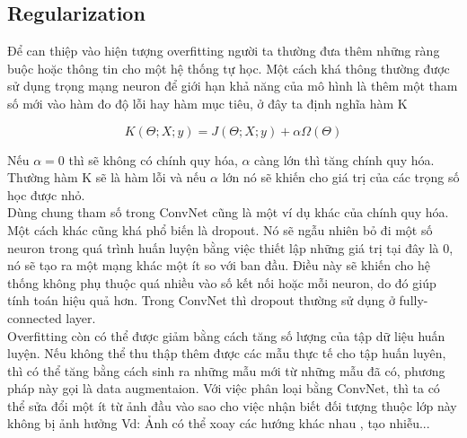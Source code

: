 \subsection{Regularization}
Để can thiệp vào hiện tượng overfitting người ta thường đưa thêm những ràng buộc hoặc thông tin cho một hệ thống tự học. 
Một cách khá thông thường được sử dụng trọng mạng neuron để giới hạn khả năng của mô hình là thêm một tham số mới vào hàm đo độ lỗi hay hàm mục tiêu, ở đây ta định nghĩa hàm K\cite{DLbook}
\begin{center}
	\begin{equation}
	 K(\Theta;X;y) = J(\Theta;X;y) + \alpha\Omega(\Theta)
	\end{equation}
\end{center}
Nếu $\alpha = 0$ thì sẽ không có chính quy hóa, $\alpha$ càng lớn thì tăng chính quy hóa. Thường hàm K sẽ là hàm lỗi và nếu $\alpha$ lớn nó sẽ khiến cho giá trị của các trọng số học được nhỏ.\\

Dùng chung tham số trong ConvNet cũng là một ví dụ khác của chính quy hóa.
Một cách khác cũng khá phổ biến là dropout. Nó sẽ ngẫu nhiên bỏ đi một số neuron trong quá trình huấn luyện bằng việc thiết lập những giá trị tại đây là 0, nó sẽ tạo ra một mạng khác một ít so với ban đầu. Điều này sẽ khiến cho hệ thống không phụ thuộc quá nhiều vào số kết nối hoặc mỗi neuron, do đó giúp tính toán hiệu quả hơn. Trong ConvNet thì dropout thường sử dụng ở fully-connected layer.\\

Overfitting còn có thể được giảm bằng cách tăng số lượng của tập dữ liệu huấn luyện. Nếu không thể thu thập thêm được các mẫu thực tế cho tập huấn luyên, thì có thể tăng bằng cách sinh ra những mẫu mới từ những mẫu đã có, phương pháp này gọi là data augmentaion. 
Với việc phân loại bằng ConvNet, thì ta có thể sửa đổi một ít từ ảnh đầu vào sao cho việc nhận biết đối tượng thuộc lớp này không bị ảnh hưởng Vd: Ảnh có thể xoay các hướng khác nhau , tạo nhiễu...

